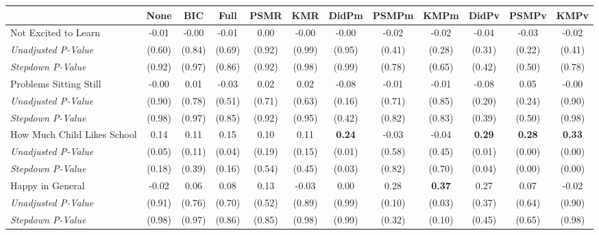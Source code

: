 \begin{tabular}{l c c c c c c c c c c c}
\toprule
 & None & BIC & Full & PSMR & KMR & DidPm & PSMPm & KMPm & DidPv & PSMPv & KMPv \\
\midrule
Not Excited to Learn & -0.01 & -0.00 & -0.01 & 0.00 & -0.00 & -0.00 & -0.02 & -0.02 & -0.04 & -0.03 & -0.02 \\
\quad \textit{Unadjusted P-Value} & (0.60) & (0.84) & (0.69) & (0.92) & (0.99) & (0.95) & (0.41) & (0.28) & (0.31) & (0.22) & (0.41) \\
\quad \textit{Stepdown P-Value} & (0.92) & (0.97) & (0.86) & (0.92) & (0.98) & (0.99) & (0.78) & (0.65) & (0.42) & (0.50) & (0.78) \\
Problems Sitting Still & -0.00 & 0.01 & -0.03 & 0.02 & 0.02 & -0.08 & -0.01 & -0.01 & -0.08 & 0.05 & -0.00 \\
\quad \textit{Unadjusted P-Value} & (0.90) & (0.78) & (0.51) & (0.71) & (0.63) & (0.16) & (0.71) & (0.85) & (0.20) & (0.24) & (0.90) \\
\quad \textit{Stepdown P-Value} & (0.98) & (0.97) & (0.85) & (0.92) & (0.95) & (0.42) & (0.82) & (0.83) & (0.39) & (0.50) & (0.98) \\
How Much Child Likes School & 0.14 & 0.11 & 0.15 & 0.10 & 0.11 & \textbf{ 0.24 } & -0.03 & -0.04 & \textbf{ 0.29 } & \textbf{ 0.28 } & \textbf{ 0.33 } \\
\quad \textit{Unadjusted P-Value} & (0.05) & (0.11) & (0.04) & (0.19) & (0.15) & (0.01) & (0.58) & (0.45) & (0.01) & (0.00) & (0.00) \\
\quad \textit{Stepdown P-Value} & (0.18) & (0.39) & (0.16) & (0.54) & (0.45) & (0.03) & (0.82) & (0.70) & (0.04) & (0.00) & (0.00) \\
Happy in General & -0.02 & 0.06 & 0.08 & 0.13 & -0.03 & 0.00 & 0.28 & \textbf{ 0.37 } & 0.27 & 0.07 & -0.02 \\
\quad \textit{Unadjusted P-Value} & (0.91) & (0.76) & (0.70) & (0.52) & (0.89) & (0.99) & (0.10) & (0.03) & (0.37) & (0.64) & (0.90) \\
\quad \textit{Stepdown P-Value} & (0.98) & (0.97) & (0.86) & (0.85) & (0.98) & (0.99) & (0.32) & (0.10) & (0.45) & (0.65) & (0.98) \\
\bottomrule
\end{tabular}
